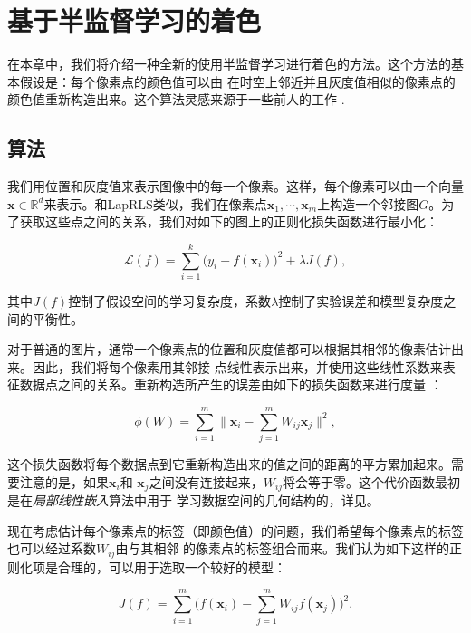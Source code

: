 \chapter{基于半监督学习的着色}
\label{chap:semi-supervised-learning}

在本章中，我们将介绍一种全新的使用半监督学习进行着色的方法。这个方法的基本假设是：每个像素点的颜色值可以由
在时空上邻近并且灰度值相似的像素点的颜色值重新构造出来。这个算法灵感来源于一些前人的工作
\cite{Manifold-Regularization-Journal,LLE,NPE}.

\section{算法}

我们用位置和灰度值来表示图像中的每一个像素。这样，每个像素可以由一个向量$\textbf{x}
\in
\mathbb{R}^d$来表示。和LapRLS类似，我们在像素点$\textbf{x}_1,
\cdots,
\textbf{x}_m$上构造一个邻接图$G$。为了获取这些点之间的关系，我们对如下的图上的正则化损失函数进行最小化：

\begin{equation}\label{eqn:regularized-regression}
    \mathcal{L}(f)= \sum_{i=1}^k \big( y_i - f(\mathbf{x}_i) \big)^2 + \lambda J(f),
\end{equation}

其中$J(f)$控制了假设空间的学习复杂度，系数$\lambda$控制了实验误差和模型复杂度之间的平衡性。

对于普通的图片，通常一个像素点的位置和灰度值都可以根据其相邻的像素估计出来。因此，我们将每个像素用其邻接
点线性表示出来，并使用这些线性系数来表征数据点之间的关系。重新构造所产生的误差由如下的损失函数来进行度量
\cite{LLE}：

$$
\phi (W) = \sum_{i=1}^{m} \| \mathbf{x}_i - \sum_{j=1}^{m} W_{ij}
\mathbf{x}_j \|^2,
$$

这个损失函数将每个数据点到它重新构造出来的值之间的距离的平方累加起来。需要注意的是，如果$\textbf{x}_i$和
$\textbf{x}_j$之间没有连接起来，$W_{ij}$将会等于零。这个代价函数最初是在\textit{局部线性嵌入}算法中用于
学习数据空间的几何结构的，详见\cite{LLE}。

现在考虑估计每个像素点的标签（即颜色值）的问题，我们希望每个像素点的标签也可以经过系数$W_{ij}$由与其相邻
的像素点的标签组合而来。我们认为如下这样的正则化项是合理的，可以用于选取一个较好的模型：

\begin{equation}\label{eqn:regularizer}
    J(f)=\sum_{i=1}^{m} \Big( f(\mathbf{x}_i) - \sum_{j=1}^{m} W_{ij} f(\mathbf{x}_j) \Big)^2.
\end{equation}

